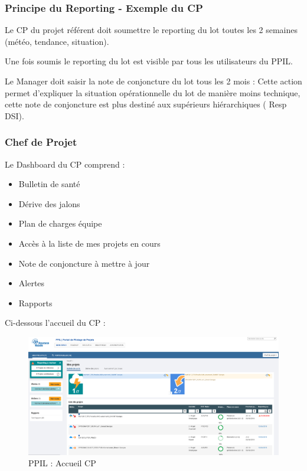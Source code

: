 \subsubsection{Principe du Reporting - Exemple du CP}
Le CP du projet référent doit soumettre le reporting du lot toutes les 2 semaines (météo, tendance, situation).

Une fois soumis le reporting du lot est visible par tous les utilisateurs du PPIL.

Le Manager doit saisir la note de conjoncture du lot tous les 2 mois : 
Cette action permet d'expliquer la situation opérationnelle du lot de manière moins technique, cette note de conjoncture est plus destiné aux supérieurs hiérarchiques ( Resp DSI).

\subsubsection{Chef de Projet}

Le Dashboard du CP comprend :

\begin{itemize}
    \item Bulletin de santé
    \item Dérive des jalons
    \item Plan de charges équipe
    \item Accès à la liste de mes projets en cours
    \item Note de conjoncture à mettre à jour
    \item Alertes
    \item Rapports
\end{itemize}

Ci-dessous l'accueil du CP :

\begin{figure}[!h]
\centering
\includegraphics[width=1\textwidth]{images/ppil-CP.PNG}
\caption{PPIL : Accueil CP}
\end{figure}

